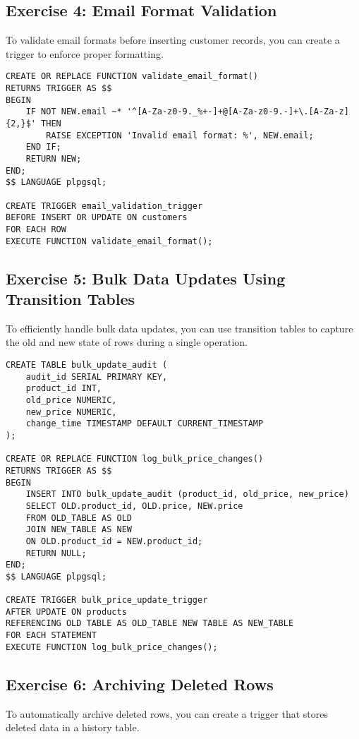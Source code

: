 \documentclass{article}
\begin{document}
\subsection*{Exercise 4: Email Format Validation}
To validate email formats before inserting customer records, you can create a trigger to enforce proper formatting.

\begin{verbatim}
CREATE OR REPLACE FUNCTION validate_email_format()
RETURNS TRIGGER AS $$
BEGIN
    IF NOT NEW.email ~* '^[A-Za-z0-9._%+-]+@[A-Za-z0-9.-]+\.[A-Za-z]{2,}$' THEN
        RAISE EXCEPTION 'Invalid email format: %', NEW.email;
    END IF;
    RETURN NEW;
END;
$$ LANGUAGE plpgsql;

CREATE TRIGGER email_validation_trigger
BEFORE INSERT OR UPDATE ON customers
FOR EACH ROW
EXECUTE FUNCTION validate_email_format();
\end{verbatim}

\subsection*{Exercise 5: Bulk Data Updates Using Transition Tables}
To efficiently handle bulk data updates, you can use transition tables to capture the old and new state of rows during a single operation.

\begin{verbatim}
CREATE TABLE bulk_update_audit (
    audit_id SERIAL PRIMARY KEY,
    product_id INT,
    old_price NUMERIC,
    new_price NUMERIC,
    change_time TIMESTAMP DEFAULT CURRENT_TIMESTAMP
);

CREATE OR REPLACE FUNCTION log_bulk_price_changes()
RETURNS TRIGGER AS $$
BEGIN
    INSERT INTO bulk_update_audit (product_id, old_price, new_price)
    SELECT OLD.product_id, OLD.price, NEW.price
    FROM OLD_TABLE AS OLD
    JOIN NEW_TABLE AS NEW
    ON OLD.product_id = NEW.product_id;
    RETURN NULL;
END;
$$ LANGUAGE plpgsql;

CREATE TRIGGER bulk_price_update_trigger
AFTER UPDATE ON products
REFERENCING OLD TABLE AS OLD_TABLE NEW TABLE AS NEW_TABLE
FOR EACH STATEMENT
EXECUTE FUNCTION log_bulk_price_changes();
\end{verbatim}

\subsection*{Exercise 6: Archiving Deleted Rows}
To automatically archive deleted rows, you can create a trigger that stores deleted data in a history table.
\end{document}
